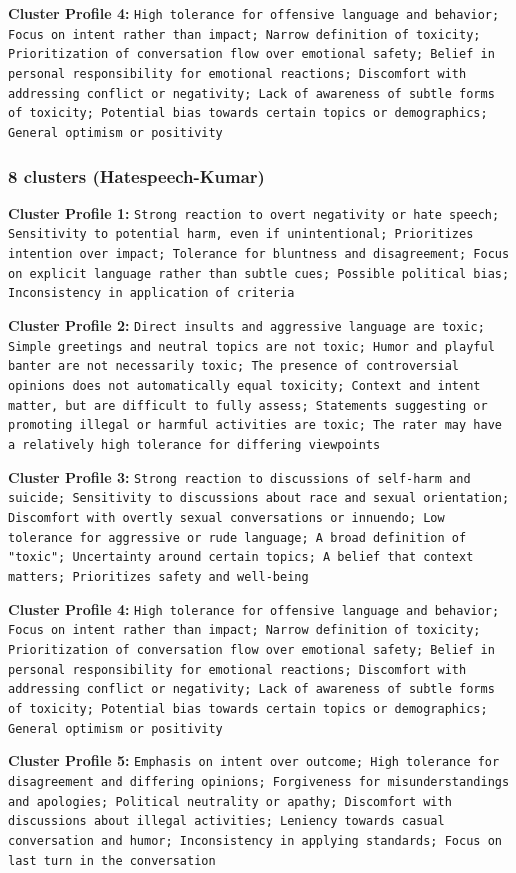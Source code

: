\documentclass[11pt]{article}
\begin{document}
\textbf{Cluster Profile 4:} \texttt{High tolerance for offensive language and behavior; Focus on intent rather than impact; Narrow definition of toxicity; Prioritization of conversation flow over emotional safety; Belief in personal responsibility for emotional reactions; Discomfort with addressing conflict or negativity; Lack of awareness of subtle forms of toxicity; Potential bias towards certain topics or demographics; General optimism or positivity}


\subsubsection{8 clusters (Hatespeech-Kumar)}


\textbf{Cluster Profile 1:} \texttt{Strong reaction to overt negativity or hate speech; Sensitivity to potential harm, even if unintentional; Prioritizes intention over impact; Tolerance for bluntness and disagreement; Focus on explicit language rather than subtle cues; Possible political bias; Inconsistency in application of criteria}


\textbf{Cluster Profile 2:} \texttt{Direct insults and aggressive language are toxic; Simple greetings and neutral topics are not toxic; Humor and playful banter are not necessarily toxic; The presence of controversial opinions does not automatically equal toxicity; Context and intent matter, but are difficult to fully assess; Statements suggesting or promoting illegal or harmful activities are toxic; The rater may have a relatively high tolerance for differing viewpoints}


\textbf{Cluster Profile 3:} \texttt{Strong reaction to discussions of self-harm and suicide; Sensitivity to discussions about race and sexual orientation; Discomfort with overtly sexual conversations or innuendo; Low tolerance for aggressive or rude language; A broad definition of "toxic"; Uncertainty around certain topics; A belief that context matters; Prioritizes safety and well-being}


\textbf{Cluster Profile 4:} \texttt{High tolerance for offensive language and behavior; Focus on intent rather than impact; Narrow definition of toxicity; Prioritization of conversation flow over emotional safety; Belief in personal responsibility for emotional reactions; Discomfort with addressing conflict or negativity; Lack of awareness of subtle forms of toxicity; Potential bias towards certain topics or demographics; General optimism or positivity}


\textbf{Cluster Profile 5:} \texttt{Emphasis on intent over outcome; High tolerance for disagreement and differing opinions; Forgiveness for misunderstandings and apologies; Political neutrality or apathy; Discomfort with discussions about illegal activities; Leniency towards casual conversation and humor; Inconsistency in applying standards; Focus on last turn in the conversation}
\end{document}

